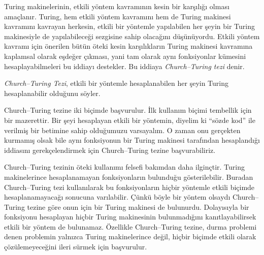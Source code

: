 \documentclass[../../../include/open-logic-section]{subfiles}
\begin{document}

Turing makinelerinin, etkili yöntem kavramının kesin bir karşılığı olması
amaçlanır. Turing, hem etkili yöntem kavramını hem de Turing makinesi kavramını
kavrayan herkesin, etkili bir yöntemle yapılabilen her şeyin bir Turing
makinesiyle de yapılabileceği sezgisine sahip olacağını düşünüyordu. Etkili
yöntem kavramı için önerilen bütün öteki kesin karşılıkların Turing makinesi
kavramına kaplamsal olarak eşdeğer çıkması, yani tam olarak aynı fonksiyonlar
kümesini hesaplayabilmeleri bu iddiayı destekler. Bu iddiaya
\emph{Church--Turing tezi} denir.

\begin{defn}
\emph{Church--Turing Tezi}, etkili bir yöntemle hesaplanabilen her şeyin
Turing hesaplanabilir olduğunu söyler.
\end{defn}

Church--Turing tezine iki biçimde başvurulur. İlk kullanım biçimi tembellik
için bir mazerettir. Bir şeyi hesaplayan etkili bir yöntemin, diyelim ki
``sözde kod'' ile verilmiş bir betimine sahip olduğumuzu varsayalım. O zaman
onu gerçekten kurmamış olsak bile aynı fonksiyonun bir Turing makinesi
tarafından hesaplandığı iddiasını gerekçelendirmek için Church--Turing tezine
başvurabiliriz.

Church--Turing tezinin öteki kullanımı felsefi bakımdan daha ilginçtir.
Turing makinelerince hesaplanamayan fonksiyonların bulunduğu gösterilebilir.
Buradan Church--Turing tezi kullanılarak bu fonksiyonların hiçbir yöntemle
etkili biçimde hesaplanamayacağı sonucuna varılabilir. Çünkü böyle bir yöntem
olsaydı Church--Turing tezine göre onun için bir Turing makinesi de bulunurdu.
Dolayısıyla bir fonksiyonu hesaplayan hiçbir Turing makinesinin bulunmadığını
kanıtlayabilirsek etkili bir yöntem de bulunamaz. Özellikle Church--Turing
tezine, durma problemi denen problemin yalnızca Turing makinelerince değil,
hiçbir biçimde etkili olarak çözülemeyeceğini ileri sürmek için başvurulur.
\end{document}

